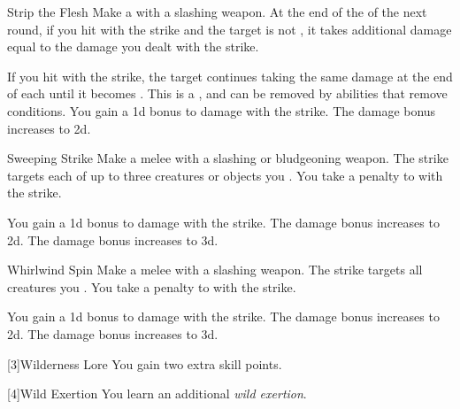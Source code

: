 {            \begin{apability}{Strip the Flesh}
                Make a  with a slashing weapon.
                At the end of the  of the next round, if you hit with the strike and the target is not , it takes additional damage equal to the damage you dealt with the strike.

                \rankline
                 If you hit with the strike, the target continues taking the same damage at the end of each  until it becomes .
                This is a , and can be removed by abilities that remove conditions.
                 You gain a \plus1d bonus to damage with the strike.
                 The damage bonus increases to \plus2d.
            \end{apability}

            \begin{apability}{Sweeping Strike}
                Make a melee  with a slashing or bludgeoning weapon.
                The strike targets each of up to three creatures or objects you .
                You take a  penalty to  with the strike.

                \rankline
                 You gain a \plus1d bonus to damage with the strike.
                 The damage bonus increases to \plus2d.
                 The damage bonus increases to \plus3d.
            \end{apability}

            \begin{apability}{Whirlwind Spin}
                Make a melee  with a slashing weapon.
                The strike targets all creatures you .
                You take a  penalty to  with the strike.

                \rankline
                 You gain a \plus1d bonus to damage with the strike.
                 The damage bonus increases to \plus2d.
                 The damage bonus increases to \plus3d.
            \end{apability}
        }

        [3]{Wilderness Lore} You gain two extra skill points.

        [4]{Wild Exertion}
        You learn an additional \textit{wild exertion}.

